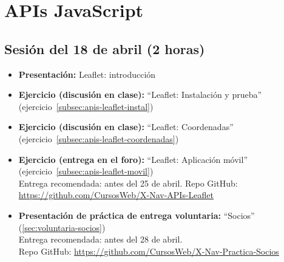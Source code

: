 \documentclass[a4paper,12pt]{report}
\begin{document}



\section{APIs JavaScript}

\subsection{Sesión del 18 de abril (2 horas)}

\begin{itemize}
\item \textbf{Presentación:} Leaflet: introducción
\item \textbf{Ejercicio (discusión en clase):} ``Leaflet: Instalación y prueba'' (ejercicio~\ref{subsec:apis-leaflet-instal})
\item \textbf{Ejercicio (discusión en clase):} ``Leaflet: Coordenadas'' (ejercicio~\ref{subsec:apis-leaflet-coordenadas})
\item \textbf{Ejercicio (entrega en el foro):} ``Leaflet: Aplicación móvil'' (ejercicio~\ref{subsec:apis-leaflet-movil}) \\
  Entrega recomendada: antes del 25 de abril.
  Repo GitHub: \url{https://github.com/CursosWeb/X-Nav-APIs-Leaflet}
\item \textbf{Presentación de práctica de entrega voluntaria:} ``Socios'' (\ref{sec:voluntaria-socios}) \\
  Entrega recomendada: antes del 28 de abril. \\
  Repo GitHub: \url{https://github.com/CursosWeb/X-Nav-Practica-Socios}
\end{itemize}
\end{document}
